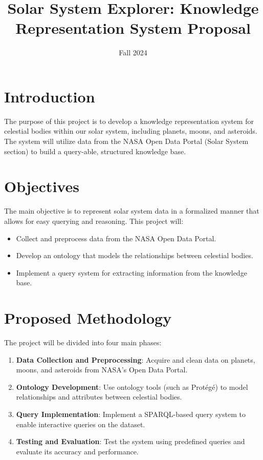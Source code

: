 \documentclass{article}
\title{Solar System Explorer: Knowledge Representation System Proposal}
\author{}
\date{Fall 2024}
\begin{document}
\maketitle

\section{Introduction}
The purpose of this project is to develop a knowledge representation system for celestial bodies within our solar system, including planets, moons, and asteroids. The system will utilize data from the NASA Open Data Portal (Solar System section) to build a query-able, structured knowledge base.

\section{Objectives}
The main objective is to represent solar system data in a formalized manner that allows for easy querying and reasoning. This project will:
\begin{itemize}
    \item Collect and preprocess data from the NASA Open Data Portal.
    \item Develop an ontology that models the relationships between celestial bodies.
    \item Implement a query system for extracting information from the knowledge base.
\end{itemize}

\section{Proposed Methodology}
The project will be divided into four main phases:
\begin{enumerate}
    \item \textbf{Data Collection and Preprocessing}: Acquire and clean data on planets, moons, and asteroids from NASA’s Open Data Portal.
    \item \textbf{Ontology Development}: Use ontology tools (such as Protégé) to model relationships and attributes between celestial bodies.
    \item \textbf{Query Implementation}: Implement a SPARQL-based query system to enable interactive queries on the dataset.
    \item \textbf{Testing and Evaluation}: Test the system using predefined queries and evaluate its accuracy and performance.
\end{enumerate}
\end{document}
